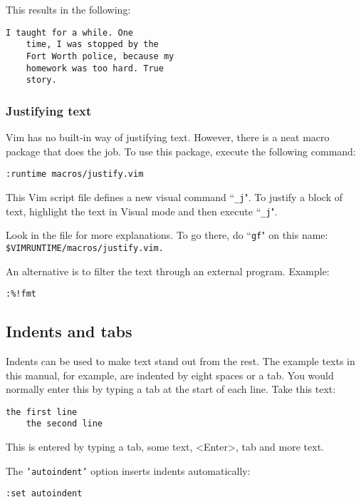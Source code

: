 This results in the following:

\begin{Verbatim}[samepage=true]
         I taught for a while. One 
    time, I was stopped by the 
    Fort Worth police, because my 
    homework was too hard. True 
    story. 
\end{Verbatim}

\subsubsection{Justifying text}
Vim has no built-in way of justifying text.
However, there is a neat macro package that does the job.
To use this package, execute the following command:

\begin{Verbatim}[samepage=true]
 :runtime macros/justify.vim
\end{Verbatim}

This Vim script file defines a new visual command ``\texttt{\_j}".
To justify a block of text, highlight the text in Visual mode and then execute ``\texttt{\_j}".

Look in the file for more explanations.
To go there, do ``\texttt{gf}" on this name:\\ \texttt{\$VIMRUNTIME/macros/justify.vim.}

An alternative is to filter the text through an external program.
Example:

\begin{Verbatim}[samepage=true]
 :%!fmt
\end{Verbatim}
\subsection{Indents and tabs}
\label{Indents and tabs}
Indents can be used to make text stand out from the rest.  The example texts
in this manual, for example, are indented by eight spaces or a tab.  You would
normally enter this by typing a tab at the start of each line.  Take this
text:

\begin{Verbatim}[samepage=true]
    the first line 
    the second line 
\end{Verbatim}

This is entered by typing a tab, some text, <Enter>, tab and more text.

The \texttt{'autoindent'} option inserts indents automatically:

\begin{Verbatim}[samepage=true]
 :set autoindent
\end{Verbatim}

